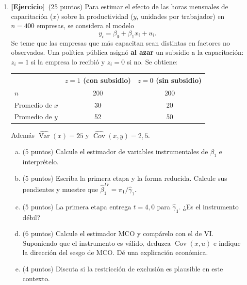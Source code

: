 \documentclass[12pt,letterpaper]{article}
\DeclareMathOperator{\var}{Var}
\DeclareMathOperator{\cov}{Cov}
\newcommand{\ejer}{\textbf{[Ejercicio]}}
\begin{document}
\begin{enumerate}[1.]
\item \ejer\ (25 puntos) Para estimar el efecto de las horas mensuales de capacitación ($x$) sobre la productividad ($y$, unidades por trabajador) en $n=400$ empresas, se considera el modelo
\[
y_i=\beta_0+\beta_1x_i+u_i .
\]
Se teme que las empresas que más capacitan sean distintas en factores no observados. Una política pública asignó \textbf{al azar} un subsidio a la capacitación: $z_i=1$ si la empresa lo recibió y $z_i=0$ si no. Se obtiene:
\begin{center}
\begin{tabular}{lcc}
\toprule
 & $z=1$ (con subsidio) & $z=0$ (sin subsidio)\\
\midrule
$n$ & 200 & 200\\
Promedio de $x$ & 30 & 20\\
Promedio de $y$ & 52 & 50\\
\bottomrule
\end{tabular}
\end{center}
Además $\widehat{\var}(x)=25$ y $\widehat{\cov}(x,y)=2{,}5$.
\begin{enumerate}[a)]
\item (5 puntos) Calcule el estimador de variables instrumentales de $\beta_1$ e interprételo.
\item (5 puntos) Escriba la primera etapa y la forma reducida. Calcule sus pendientes y muestre que $\hat\beta_1^{IV}=\hat\pi_1/\hat\gamma_1$.
\item (5 puntos) La primera etapa entrega $t=4{,}0$ para $\hat\gamma_1$. ¿Es el instrumento débil?
\item (6 puntos) Calcule el estimador MCO y compárelo con el de VI. Suponiendo que el instrumento es válido, deduzca $\cov(x,u)$ e indique la dirección del sesgo de MCO. Dé una explicación económica.
\item (4 puntos) Discuta si la restricción de exclusión es plausible en este contexto.
\end{enumerate}


\end{enumerate}
\end{document}
